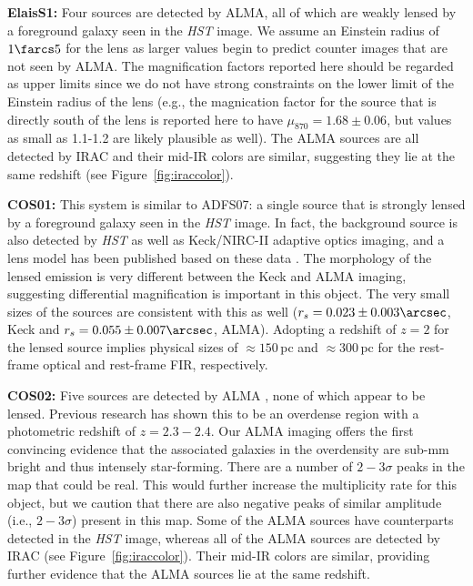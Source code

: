 \documentclass[iop]{emulateapj}
\begin{document}
{\bf ElaisS1:} Four sources are detected by ALMA, all of which are weakly lensed
by a foreground galaxy seen in the {\it HST} image.  We assume an Einstein
radius of $1\farcs5$ for the lens as larger values begin to predict counter
images that are not seen by ALMA.  The magnification factors reported here
should be regarded as upper limits since we do not have strong constraints on
the lower limit of the Einstein radius of the lens (e.g., the magnication factor
for the source that is directly south of the lens is reported here to have
$\mu_{870} = 1.68 \pm 0.06$, but values as small as 1.1-1.2 are likely plausible
as well).  The ALMA sources are all detected by IRAC and their mid-IR colors are
similar, suggesting they lie at the same redshift (see
Figure~\ref{fig:iraccolor}).

{\bf COS01:} This system is similar to ADFS07: a single source that is strongly
lensed by a foreground galaxy seen in the {\it HST} image.  In fact, the
background source is also detected by {\it HST} as well as Keck/NIRC-II
adaptive optics imaging, and a lens model has been published based on these
data \citep{Calanog:2014lr}.  The morphology of the lensed emission is very
different between the Keck and ALMA imaging, suggesting differential
magnification is important in this object.  The very small sizes of the sources
are consistent with this as well ($r_s = 0.023 \pm 0.003\arcsec$, Keck and $r_s
= 0.055 \pm 0.007\arcsec$, ALMA).  Adopting a redshift of $z=2$ for the lensed
source implies physical sizes of $\approx 150\,$pc and $\approx 300\,$pc for
the rest-frame optical and rest-frame FIR, respectively.

{\bf COS02:} Five sources are detected by ALMA \citep[the brightest of which has
already been detected;][]{Smolcic:2012zl}, none of which appear to be lensed.
Previous research has shown this to be an overdense region \citep[this object is
called COSBO3 in][]{Aravena:2010fr} with a photometric redshift of $z=2.3-2.4$.
Our ALMA imaging offers the first convincing evidence that the associated
galaxies in the overdensity are sub-mm bright and thus intensely star-forming.
There are a number of $2-3\sigma$ peaks in the map that could be real.  This
would further increase the multiplicity rate for this object, but we caution
that there are also negative peaks of similar amplitude (i.e., $2-3\sigma$)
present in this map.  Some of the ALMA sources have counterparts detected in the
{\it HST} image, whereas all of the ALMA sources are detected by IRAC (see
Figure~\ref{fig:iraccolor}).  Their mid-IR colors are similar, providing further
evidence that the ALMA sources lie at the same redshift.  
\end{document}
